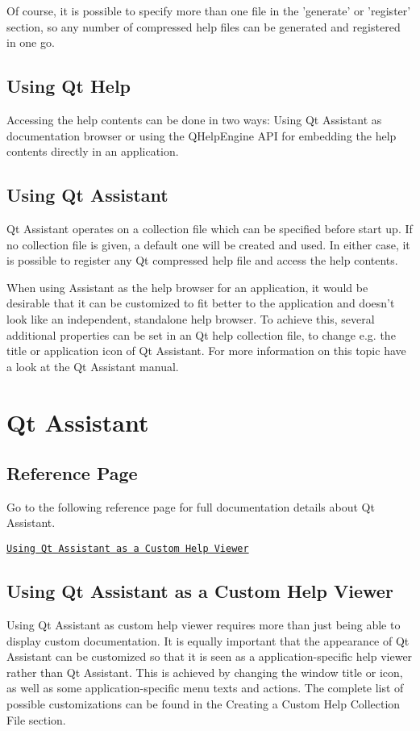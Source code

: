Of course, it is possible to specify more than one file in the 'generate' or 'register' section, so any number of compressed help files can be generated and registered in one go.\hypertarget{collection_collection_usinghelp}{}\subsection{Using Qt Help}\label{collection_collection_usinghelp}
Accessing the help contents can be done in two ways\-: Using Qt Assistant as documentation browser or using the Q\-Help\-Engine A\-P\-I for embedding the help contents directly in an application.\hypertarget{collection_collection_usingassistant}{}\subsection{Using Qt Assistant}\label{collection_collection_usingassistant}
Qt Assistant operates on a collection file which can be specified before start up. If no collection file is given, a default one will be created and used. In either case, it is possible to register any Qt compressed help file and access the help contents.

When using Assistant as the help browser for an application, it would be desirable that it can be customized to fit better to the application and doesn't look like an independent, standalone help browser. To achieve this, several additional properties can be set in an Qt help collection file, to change e.\-g. the title or application icon of Qt Assistant. For more information on this topic have a look at the Qt Assistant manual. \hypertarget{assistant}{}\section{Qt Assistant}\label{assistant}
\hypertarget{assistant_assisant_ref}{}\subsection{Reference Page}\label{assistant_assisant_ref}
Go to the following reference page for full documentation details about Qt Assistant.

\href{http://qt-project.org/doc/qt-4.8/assistant-custom-help-viewer.html}{\tt Using Qt Assistant as a Custom Help Viewer}\hypertarget{assistant_assisant_intro}{}\subsection{Using Qt Assistant as a Custom Help Viewer}\label{assistant_assisant_intro}
Using Qt Assistant as custom help viewer requires more than just being able to display custom documentation. It is equally important that the appearance of Qt Assistant can be customized so that it is seen as a application-\/specific help viewer rather than Qt Assistant. This is achieved by changing the window title or icon, as well as some application-\/specific menu texts and actions. The complete list of possible customizations can be found in the Creating a Custom Help Collection File section.

